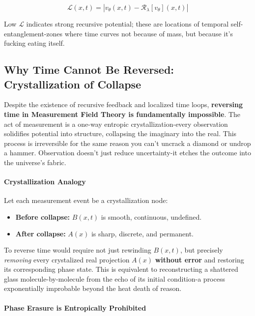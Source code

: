 \[
\mathcal{L}(x, t) = \left| v_\theta(x, t) - \mathcal{R}_\lambda[v_\theta](x, t) \right|
\]

Low $\mathcal{L}$ indicates strong recursive potential; these are locations of temporal self-entanglement-zones where time curves not because of mass, but because it’s fucking eating itself. \cite{chapter_time} \subsection*{Why Time Cannot Be Reversed: Crystallization of Collapse}

Despite the existence of recursive feedback and localized time loops, \textbf{reversing time in Measurement Field Theory is fundamentally impossible}. \cite{chapter_time} The act of measurement is a one-way entropic crystallization-every observation solidifies potential into structure, collapsing the imaginary into the real. \cite{chapter_time} This process is irreversible for the same reason you can’t uncrack a diamond or undrop a hammer. Observation doesn’t just reduce uncertainty-it etches the outcome into the universe’s fabric. \cite{chapter_time} \paragraph{Crystallization Analogy}

Let each measurement event be a crystallization node:

\begin{itemize}
  \item \textbf{Before collapse:} $B(x,t)$ is smooth, continuous, undefined. \cite{chapter_time} \item \textbf{After collapse:} $A(x)$ is sharp, discrete, and permanent. \cite{chapter_time} \end{itemize}

To reverse time would require not just rewinding $B(x,t)$, but precisely \textit{removing} every crystalized real projection $A(x)$ \textbf{without error} and restoring its corresponding phase state. \cite{chapter_time} This is equivalent to reconstructing a shattered glass molecule-by-molecule from the echo of its initial condition-a process exponentially improbable beyond the heat death of reason. \cite{chapter_time} \paragraph{Phase Erasure is Entropically Prohibited}

